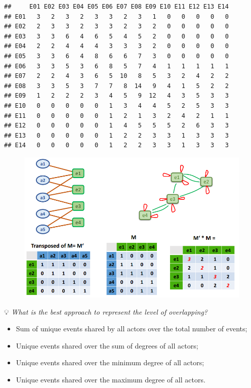 \documentclass[
  notitlepage,
  onecolumn,
  openany]{book}
\providecommand{\tightlist}{%
  \setlength{\itemsep}{0pt}\setlength{\parskip}{0pt}}
\begin{document}
\begin{verbatim}
##     E01 E02 E03 E04 E05 E06 E07 E08 E09 E10 E11 E12 E13 E14
## E01   3   2   3   2   3   3   2   3   1   0   0   0   0   0
## E02   2   3   3   2   3   3   2   3   2   0   0   0   0   0
## E03   3   3   6   4   6   5   4   5   2   0   0   0   0   0
## E04   2   2   4   4   4   3   3   3   2   0   0   0   0   0
## E05   3   3   6   4   8   6   6   7   3   0   0   0   0   0
## E06   3   3   5   3   6   8   5   7   4   1   1   1   1   1
## E07   2   2   4   3   6   5  10   8   5   3   2   4   2   2
## E08   3   3   5   3   7   7   8  14   9   4   1   5   2   2
## E09   1   2   2   2   3   4   5   9  12   4   3   5   3   3
## E10   0   0   0   0   0   1   3   4   4   5   2   5   3   3
## E11   0   0   0   0   0   1   2   1   3   2   4   2   1   1
## E12   0   0   0   0   0   1   4   5   5   5   2   6   3   3
## E13   0   0   0   0   0   1   2   2   3   3   1   3   3   3
## E14   0   0   0   0   0   1   2   2   3   3   1   3   3   3
\end{verbatim}

\begin{figure}[h!]

{\centering \includegraphics[width=0.5\linewidth]{images/10-Two mode networks/Untitled} 

}

\end{figure}

💡 \emph{What is the best approach to represent the level of overlapping?}

\begin{itemize}
\tightlist
\item
  Sum of unique events shared by all actors over the total number of events;
\item
  Unique events shared over the sum of degrees of all actors;
\item
  Unique events shared over the minimum degree of all actors;
\item
  Unique events shared over the maximum degree of all actors.
\end{itemize}
\end{document}
